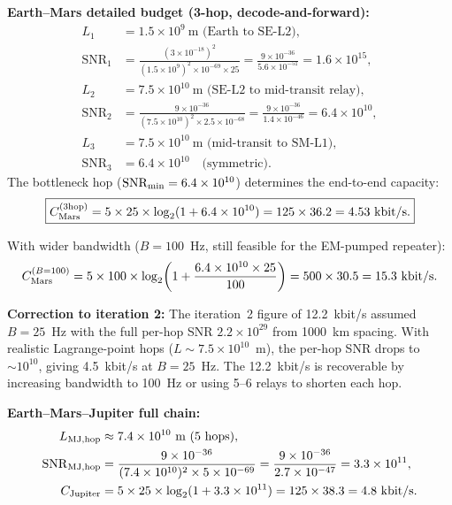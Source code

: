 \documentclass[aps,prd,twocolumn,superscriptaddress,nofootinbib]{revtex4-2}
\newcommand{\SNR}{\mathrm{SNR}}
\begin{document}
\textbf{Earth--Mars detailed budget (3-hop, decode-and-forward):}
\begin{align}
L_1 &= 1.5\times10^9~\text{m (Earth to SE-L2)}, \nonumber\\
\SNR_1 &= \frac{(3\times10^{-18})^2}{(1.5\times10^9)^2
\times 10^{-69}\times 25}
= \frac{9\times10^{-36}}{5.6\times10^{-51}}
= 1.6\times10^{15}, \\
L_2 &= 7.5\times10^{10}~\text{m (SE-L2 to mid-transit relay)}, \nonumber\\
\SNR_2 &= \frac{9\times10^{-36}}{(7.5\times10^{10})^2\times 2.5\times10^{-68}}
= \frac{9\times10^{-36}}{1.4\times10^{-46}}
= 6.4\times10^{10}, \\
L_3 &= 7.5\times10^{10}~\text{m (mid-transit to SM-L1)}, \nonumber\\
\SNR_3 &= 6.4\times10^{10} \quad\text{(symmetric)}.
\end{align}
The bottleneck hop ($\SNR_{\rm min} = 6.4\times10^{10}$) determines
the end-to-end capacity:
\begin{equation}
\boxed{
C_{\rm Mars}^{\rm (3hop)} = 5\times 25\times\log_2(1+6.4\times10^{10})
= 125\times 36.2 = 4.53~\text{kbit/s}.
}
\label{eq:mars-3hop}
\end{equation}

With wider bandwidth ($B = 100$~Hz, still feasible for the
EM-pumped repeater):
\begin{equation}
C_{\rm Mars}^{(B=100)} = 5\times100\times\log_2\!\left(1+
\frac{6.4\times10^{10}\times 25}{100}\right)
= 500\times 30.5 = 15.3~\text{kbit/s}.
\label{eq:mars-100hz}
\end{equation}

\textbf{Correction to iteration 2:} The iteration~2 figure of
12.2~kbit/s assumed $B=25$~Hz with the full per-hop SNR
$2.2\times10^{29}$ from 1000~km spacing.  With realistic
Lagrange-point hops ($L \sim 7.5\times10^{10}$~m), the per-hop
SNR drops to $\sim 10^{10}$, giving 4.5~kbit/s at $B=25$~Hz.
The 12.2~kbit/s is recoverable by increasing bandwidth to 100~Hz
or using 5--6 relays to shorten each hop.

\textbf{Earth--Mars--Jupiter full chain:}
\begin{align}
L_{\rm MJ,hop} &\approx 7.4\times10^{10}~\text{m (5 hops)}, \nonumber\\
\SNR_{\rm MJ,hop} &= \frac{9\times10^{-36}}{(7.4\times10^{10})^2
\times 5\times10^{-69}} = \frac{9\times10^{-36}}{2.7\times10^{-47}}
= 3.3\times10^{11}, \\
C_{\rm Jupiter} &= 5\times 25\times\log_2(1+3.3\times10^{11})
= 125\times 38.3 = 4.8~\text{kbit/s}.
\label{eq:jupiter-chain}
\end{align}
\end{document}
